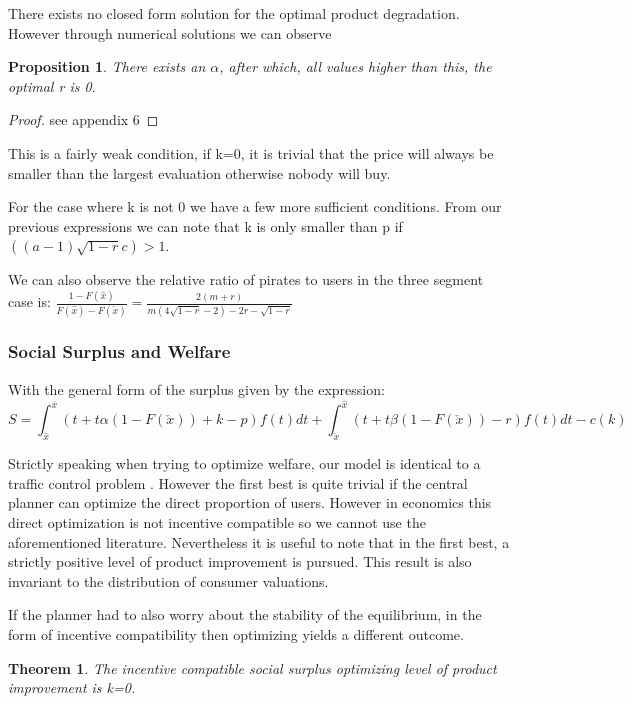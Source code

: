 \documentclass{article}
\newtheorem{theorem}{Theorem}
\newtheorem{proposition}{Proposition}
\begin{document}
There exists no closed form solution for the optimal product degradation. However through numerical solutions we can observe 

\begin{proposition}
There exists an $\alpha$, after which, all values higher than this, the optimal r is 0.  
\end{proposition}

\begin{proof}
see appendix 6
\end{proof}

This is a fairly weak condition, if k=0, it is trivial that the price will always be smaller than the largest evaluation otherwise nobody will buy. 

For the case where k is not 0 we have a few more sufficient conditions. From our previous expressions we can note that k is only smaller than p if $((a-1)\sqrt{1-r}c)>1$. 

We can also observe the relative ratio of pirates to users in the three segment case is: $\frac{1-F(\hat{x})}{F(\hat{x})-F(\check{x})}=\frac{2(m+r)}{m(4\sqrt{1-r}-2)-2r-\sqrt{1-r}}$

\subsubsection{Social Surplus and Welfare}

With the general form of the surplus given by the expression: 
\[
S = \int_{\hat{x}}^{\overline{x}}(t + t\alpha(1-F(\check{x})) +k -p)f(t)dt 
+ \int_{\check{x}}^{\hat{x}}(t+t\beta(1-F( \check{x} )) -r)f(t) dt - c(k) 
\] 

Strictly speaking when trying to optimize welfare, our model is identical to a traffic control problem \cite{WD52}. However the first best is quite trivial if the central planner can optimize the direct proportion of users. However in economics this direct optimization is not incentive compatible so we cannot use the aforementioned literature. Nevertheless it is useful to note that in the first best, a strictly positive level of product improvement is pursued. This result is also invariant to the distribution of consumer valuations.   

If the planner had to also worry about the stability of the equilibrium, in the form of incentive compatibility then optimizing yields a different outcome. 

\begin{theorem}
The incentive compatible social surplus optimizing level of product improvement is k=0. 
\end{theorem}
\end{document}
